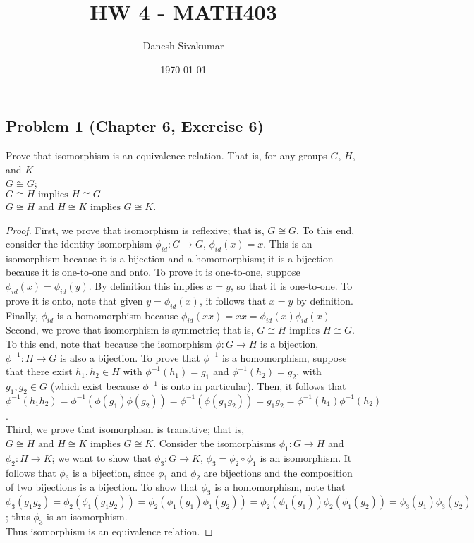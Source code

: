 \documentclass{article}
\title{HW 4 - MATH403}
\author{Danesh Sivakumar}
\date\today
\begin{document}
\maketitle 

\subsection*{Problem 1 (Chapter 6, Exercise 6)}
Prove that isomorphism is an equivalence relation. That is, for any groups $G$, $H$, and $K$ \\
$G \cong G$; \\
$G \cong H \text{ implies } H \cong G$ \\
$G \cong H \text{ and } H \cong K \text{ implies } G \cong K$.

\begin{proof}
First, we prove that isomorphism is reflexive; that is, $G \cong G$. To this end, consider the identity isomorphism $\phi_{id} \colon G \to G$, $\phi_{id}(x) = x$. This is an isomorphism because it is a bijection and a homomorphism; it is a bijection because it is one-to-one and onto. To prove it is one-to-one, suppose $\phi_{id}(x) = \phi_{id}(y)$. By definition this implies $x = y$, so that it is one-to-one. To prove it is onto, note that given $y = \phi_{id}(x)$, it follows that $x = y$ by definition. Finally, $\phi_{id}$ is a homomorphism because $\phi_{id}(xx) = xx = \phi_{id}(x)\phi_{id}(x)$ \\
Second, we prove that isomorphism is symmetric; that is, $G \cong H \text{ implies } H \cong G$. To this end, note that because the isomorphism $\phi \colon G \to H$ is a bijection, $\phi^{-1} \colon H \to G$ is also a bijection. To prove that $\phi^{-1}$ is a homomorphism, suppose that there exist $h_1, h_2 \in H$ with $\phi^{-1}(h_1) = g_1$ and $\phi^{-1}(h_2) = g_2$, with $g_1, g_2 \in G$ (which exist because $\phi^{-1}$ is onto in particular). Then, it follows that $\phi^{-1}(h_1h_2) = \phi^{-1}(\phi(g_1)\phi(g_2)) = \phi^{-1}(\phi(g_1g_2)) = g_1g_2 = \phi^{-1}(h_1)\phi^{-1}(h_2)$. \\
Third, we prove that isomorphism is transitive; that is, $G \cong H \text{ and } H \cong K \text{ implies } G \cong K$. Consider the isomorphisms $\phi_1 \colon G \to H$ and $\phi_2 \colon H \to K$; we want to show that $\phi_3 \colon G \to K$, $\phi_3 = \phi_2 \circ \phi_1$ is an isomorphism. It follows that $\phi_3$ is a bijection, since $\phi_1$ and $\phi_2$ are bijections and the composition of two bijections is a bijection. To show that $\phi_3$ is a homomorphism, note that $\phi_3(g_1g_2) = \phi_2(\phi_1(g_1g_2)) = \phi_2(\phi_1(g_1)\phi_1(g_2)) = \phi_2(\phi_1(g_1))\phi_2(\phi_1(g_2)) = \phi_3(g_1)\phi_3(g_2)$; thus $\phi_3$ is an isomorphism. \\
Thus isomorphism is an equivalence relation.

\end{proof}
\end{document}
